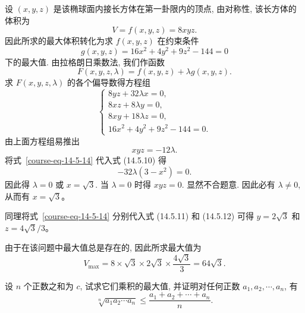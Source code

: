 \documentclass[12pt,fontset=fandol]{ctexart}
\begin{document}
\begin{solve}\quad 设 $(x,y,z)$ 是该椭球面内接长方体在第一卦限内的顶点, 由对称性, 该长方体的体积为
\[
  V=f(x,y,z)=8xyz.
\]
因此所求的最大体积转化为求 $f(x,y,z)$ 在约束条件
\[
  g(x,y,z)=16x^2+4y^2+9z^2-144=0
\]
下的最大值. 由拉格朗日乘数法, 我们作函数
\[
  F(x,y,z,\lambda)=f(x,y,z)+\lambda g(x,y,z).
\]
求 $F(x,y,z,\lambda)$ 的各个偏导数得方程组
\[
  \begin{cases}
    8yz+32\lambda x=0,\\
    8xz+8\lambda y=0,\\
    8xy+18\lambda z=0,\\
    16x^2+4y^2+9z^2-144=0.
  \end{cases}
  \label{course-eq-lagrange-box}
\]
由上面方程组易推出
\begin{equation}
  xyz=-12\lambda.
  \label{course-eq-14-5-14}
\end{equation}
将式~\eqref{course-eq-14-5-14}  代入式 (14.5.10) 得
\[
  -32\lambda(3-x^2)=0.
\]
因此得 $\lambda=0$ 或 $x=\sqrt3$. 当 $\lambda=0$ 时得 $xyz=0$. 显然不合题意. 因此必有 $\lambda\ne0$, 从而有 $x=\sqrt3$。

同理将式~\eqref{course-eq-14-5-14}  分别代入式 (14.5.11) 和 (14.5.12) 可得 $y=2\sqrt3$ 和 $z=4\sqrt3/3$。

由于在该问题中最大值总是存在的, 因此所求最大值为
\[
  V_{\max}=8\times\sqrt3\times2\sqrt3\times\frac{4\sqrt3}{3}=64\sqrt3.
\]

\end{solve}
\begin{example}\label{course-example-14-5-5}\quad 设 $n$ 个正数之和为 $c$, 试求它们乘积的最大值, 并证明对任何正数 $a_1,a_2,\cdots,a_n$, 有
\[
  \sqrt[n]{a_1a_2\cdots a_n}
  \leqslant
  \frac{a_1+a_2+\cdots+a_n}{n}.
\]

\end{example}
\end{document}
